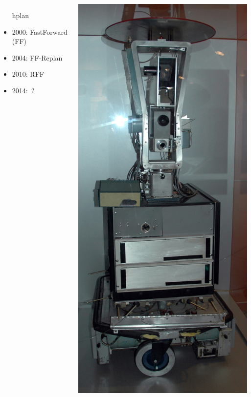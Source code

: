 \documentclass{beamer}
\begin{document}
\begin{frame}
\begin{columns}
\begin{itemize}
hplan
      \item 2000: FastForward (FF)
      \item 2004: FF-Replan
      \item 2010: RFF
      \item 2014:~?
    \end{itemize}

    \includegraphics[width=\textwidth]{images/shakey.png}

  \end{columns}
\end{frame}
\end{document}
